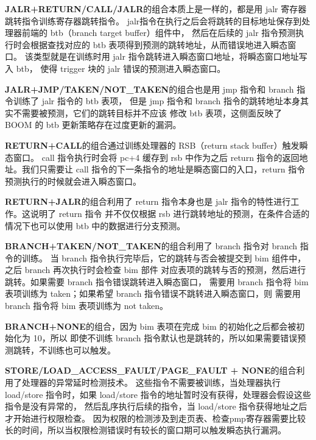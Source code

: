 \textbf{JALR+RETURN/CALL/JALR}的组合本质上是一样的，都是用 jalr 寄存器跳转指令训练寄存器跳转指令。
jalr指令在执行之后会将跳转的目标地址保存到处理器前端的 btb（branch target buffer）组件中，
然后在后续的 jalr 指令预测执行时会根据查找对应的 btb 表项得到预测的跳转地址，从而错误地进入瞬态窗口。
该类型就是在训练时用 jalr 指令跳转进入瞬态窗口地址，将瞬态窗口地址写入 btb，
使得 trigger 块的 jalr 错误的预测进入瞬态窗口。\par

\textbf{JALR+JMP/TAKEN/NOT\_TAKEN}的组合也是用 jmp 指令和 branch 指令训练了 jalr 指令的 btb 表项，
但是 jmp 指令和 branch 指令的跳转地址本身其实不需要被预测，它们的跳转目标并不应该
修改 btb 表项，这侧面反映了 BOOM 的 btb 更新策略存在过度更新的漏洞。\par

\textbf{RETURN+CALL}的组合通过训练处理器的 RSB（return stack buffer）触发瞬态窗口。
call 指令执行时会将 pc+4 缓存到 rsb 中作为之后 return 指令的返回地址。我们只需要让
call 指令的下一条指令的地址是瞬态窗口的入口，return 指令预测执行的时候就会进入瞬态窗口。\par

\textbf{RETURN+JALR}的组合利用了 return 指令本身也是 jalr 指令的特性进行工作。这说明了 return 指令
并不仅仅根据 rsb 进行跳转地址的预测，在条件合适的情况下也可以使用 btb 中的数据进行分支预测。\par

\textbf{BRANCH+TAKEN/NOT\_TAKEN}的组合利用了 branch 指令对 branch 指令的训练。
当 branch 指令执行完毕后，它的跳转与否会被提交到 bim 组件中，之后 branch 再次执行时会检查 bim 部件
对应表项的跳转与否的预测，然后进行跳转。如果需要 branch 指令错误跳转进入瞬态窗口，
需要用 branch 指令将 bim 表项训练为 taken；如果希望 branch 指令错误不跳转进入瞬态窗口，则
需要用 branch 指令将 bim 表项训练为 not taken。\par

\textbf{BRANCH+NONE}的组合，因为 bim 表项在完成 bim 的初始化之后都会被初始化为 10，所以
即使不训练 branch 指令默认也是跳转的，所以如果需要错误预测跳转，不训练也可以触发。\par

\textbf{STORE/LOAD\_ACCESS\_FAULT/PAGE\_FAULT + NONE}的组合利用了处理器的异常延时检测技术。
这些指令不需要被训练，当处理器执行 load/store 指令时，如果 load/store 指令的地址暂时没有获得，处理器会假设这些指令是没有异常的，
然后乱序执行后续的指令，当 load/store 指令获得地址之后才开始进行权限检查。
因为权限的检测涉及到走页表、检查pmp寄存器需要比较长的时间，所以当权限检测错误时有较长的窗口期可以触发瞬态执行漏洞。\par

